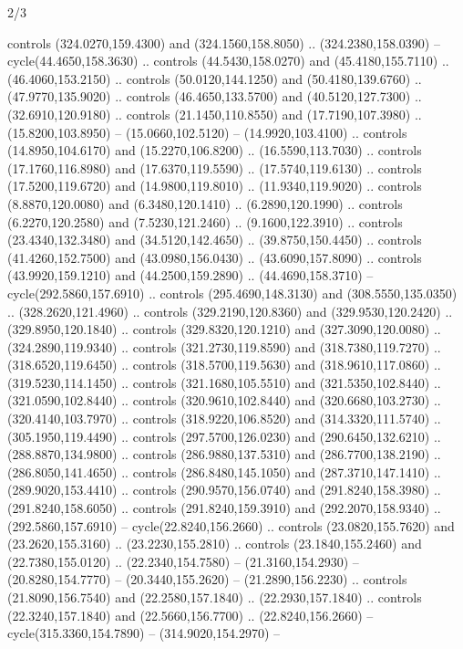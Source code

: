 \begin{flagdescription}{2/3}
\begin{scope}[xshift=0.5\flaglength,yshift=0.5\flagwidth,scale=\stretchfactor]
\begin{scope}[scale=0.001645\flagwidth,yshift=65mm,xshift=-63mm]
\begin{scope}[y=0.80pt, x=0.80pt, yscale=-1,]
\begin{scope}[cm={{1.33333,0.0,0.0,1.33333,(0.0,1e-05)}}]
  controls (324.0270,159.4300) and (324.1560,158.8050) .. (324.2380,158.0390) --
  cycle(44.4650,158.3630) .. controls (44.5430,158.0270) and (45.4180,155.7110)
  .. (46.4060,153.2150) .. controls (50.0120,144.1250) and (50.4180,139.6760) ..
  (47.9770,135.9020) .. controls (46.4650,133.5700) and (40.5120,127.7300) ..
  (32.6910,120.9180) .. controls (21.1450,110.8550) and (17.7190,107.3980) ..
  (15.8200,103.8950) -- (15.0660,102.5120) -- (14.9920,103.4100) .. controls
  (14.8950,104.6170) and (15.2270,106.8200) .. (16.5590,113.7030) .. controls
  (17.1760,116.8980) and (17.6370,119.5590) .. (17.5740,119.6130) .. controls
  (17.5200,119.6720) and (14.9800,119.8010) .. (11.9340,119.9020) .. controls
  (8.8870,120.0080) and (6.3480,120.1410) .. (6.2890,120.1990) .. controls
  (6.2270,120.2580) and (7.5230,121.2460) .. (9.1600,122.3910) .. controls
  (23.4340,132.3480) and (34.5120,142.4650) .. (39.8750,150.4450) .. controls
  (41.4260,152.7500) and (43.0980,156.0430) .. (43.6090,157.8090) .. controls
  (43.9920,159.1210) and (44.2500,159.2890) .. (44.4690,158.3710) --
  cycle(292.5860,157.6910) .. controls (295.4690,148.3130) and
  (308.5550,135.0350) .. (328.2620,121.4960) .. controls (329.2190,120.8360) and
  (329.9530,120.2420) .. (329.8950,120.1840) .. controls (329.8320,120.1210) and
  (327.3090,120.0080) .. (324.2890,119.9340) .. controls (321.2730,119.8590) and
  (318.7380,119.7270) .. (318.6520,119.6450) .. controls (318.5700,119.5630) and
  (318.9610,117.0860) .. (319.5230,114.1450) .. controls (321.1680,105.5510) and
  (321.5350,102.8440) .. (321.0590,102.8440) .. controls (320.9610,102.8440) and
  (320.6680,103.2730) .. (320.4140,103.7970) .. controls (318.9220,106.8520) and
  (314.3320,111.5740) .. (305.1950,119.4490) .. controls (297.5700,126.0230) and
  (290.6450,132.6210) .. (288.8870,134.9800) .. controls (286.9880,137.5310) and
  (286.7700,138.2190) .. (286.8050,141.4650) .. controls (286.8480,145.1050) and
  (287.3710,147.1410) .. (289.9020,153.4410) .. controls (290.9570,156.0740) and
  (291.8240,158.3980) .. (291.8240,158.6050) .. controls (291.8240,159.3910) and
  (292.2070,158.9340) .. (292.5860,157.6910) -- cycle(22.8240,156.2660) ..
  controls (23.0820,155.7620) and (23.2620,155.3160) .. (23.2230,155.2810) ..
  controls (23.1840,155.2460) and (22.7380,155.0120) .. (22.2340,154.7580) --
  (21.3160,154.2930) -- (20.8280,154.7770) -- (20.3440,155.2620) --
  (21.2890,156.2230) .. controls (21.8090,156.7540) and (22.2580,157.1840) ..
  (22.2930,157.1840) .. controls (22.3240,157.1840) and (22.5660,156.7700) ..
  (22.8240,156.2660) -- cycle(315.3360,154.7890) -- (314.9020,154.2970) --

\end{scope}
\end{scope}
\end{scope}
\end{scope}
\end{flagdescription}
